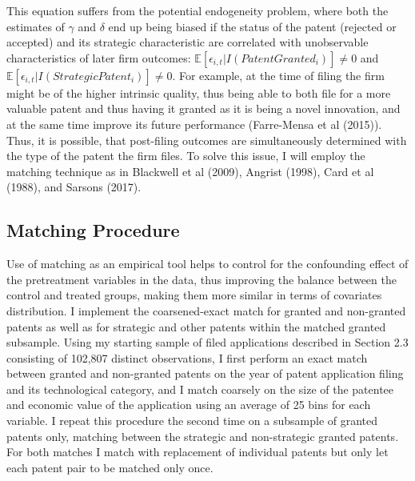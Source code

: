 \documentclass[11pt]{article}
\begin{document}
This equation suffers from the potential endogeneity problem, where both the estimates of $\gamma$
 and $\delta$ end up being biased if the status of the patent (rejected or accepted) and its strategic characteristic
 are correlated with unobservable characteristics of later firm outcomes: $\mathbb{E}[ \epsilon_{i,t}|I(PatentGranted_i)] \neq
 0$ and $\mathbb{E}[ \epsilon_{i,t}|I(StrategicPatent_i)] \neq
 0$. For example, at the time of filing the firm might be of the
 higher intrinsic quality, thus being able to both file for a more valuable patent and thus having
 it granted as it is being a novel innovation, and at the same time improve its future performance
\color{blue}(Farre-Mensa et al (2015))\color{black}. Thus, it is possible, that post-filing outcomes are
simultaneously determined with the type of the patent the firm files. To solve this issue, I will
employ the matching technique as in \color{blue}Blackwell et al (2009), Angrist (1998), Card et al (1988), and Sarsons (2017)\color{black}.

\subsection{Matching Procedure}

Use of matching as an empirical tool helps to control for the confounding effect of the pretreatment variables in the data, thus improving the balance between the control and treated groups, making them more similar in terms of covariates distribution. I implement the coarsened-exact match for granted and non-granted patents as well as for strategic and other patents within the matched granted subsample. Using my starting sample of filed applications  described in Section 2.3 consisting of 102,807 distinct observations, I first perform an exact match between granted and non-granted patents on the year of patent application filing and its technological category, and I match coarsely on the size of the patentee and economic value of the application using an average of 25 bins for each variable. I repeat this procedure the second time on a subsample of granted patents only, matching between the strategic and non-strategic granted patents. For both matches I match with replacement of individual patents but only let each patent pair to be matched only once. 
\end{document}
